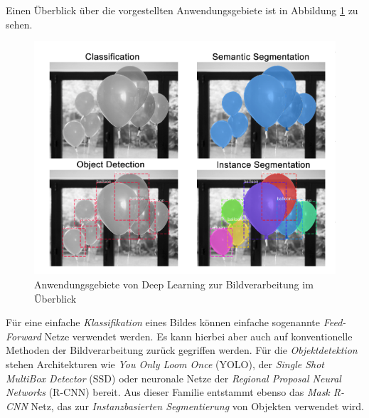 Einen Überblick über die vorgestellten Anwendungsgebiete ist in Abbildung \ref{applications} zu sehen.

\begin{figure}[ht]
	\begin{center}
		\includegraphics[width=12cm]{Bilder/applications.png} 
		\caption[Anwendungsgebiete von Deep Learning zur Bildverarbeitung im Überblick]{Anwendungsgebiete von Deep Learning zur Bildverarbeitung im Überblick \cite{PriyaDwivedi.20190328}}
		\label{applications}
	\end{center}
\end{figure}

Für eine einfache \textit{Klassifikation} eines Bildes können einfache sogenannte \textit{Feed-Forward} Netze verwendet werden. Es kann hierbei aber auch auf konventionelle Methoden der Bildverarbeitung zurück gegriffen werden. Für die \textit{Objektdetektion} stehen Architekturen wie \textit{You Only Loom Once} (YOLO), der \textit{Single Shot MultiBox Detector} (SSD) oder neuronale Netze der \textit{Regional Proposal Neural Networks} (R-CNN) bereit. Aus dieser Familie entstammt ebenso das \textit{Mask R-CNN} Netz, das zur \textit{Instanzbasierten Segmentierung} von Objekten verwendet wird.
